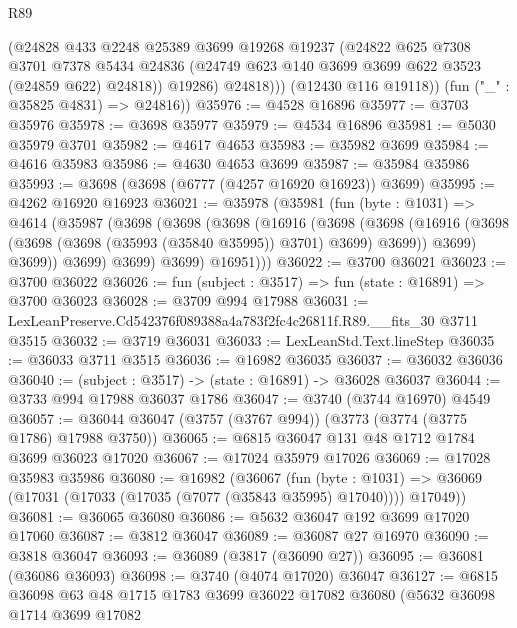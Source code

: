 \begin{lexlean}{R89}
\begin{coremodule}
              (@24828
                @433
                @2248
                @25389
                @3699
                @19268
                @19237
                (@24822
                  @625
                  @7308
                  @3701
                  @7378
                  @5434
                  @24836
                  (@24749 @623 @140 @3699 @3699 @622 @3523 (@24859 @622) @24818))
                @19286)
              @24818)))
        (@12430 @116 @19118))
      (fun ("_" : @35825 @4831) => @24816))
@35976 := @4528 @16896
@35977 := @3703 @35976
@35978 := @3698 @35977
@35979 := @4534 @16896
@35981 := @5030 @35979 @3701
@35982 := @4617 @4653
@35983 := @35982 @3699
@35984 := @4616 @35983
@35986 := @4630 @4653 @3699
@35987 := @35984 @35986
@35993 := @3698 (@3698 (@6777 (@4257 @16920 @16923)) @3699)
@35995 := @4262 @16920 @16923
@36021 := @35978
    (@35981
      (fun (byte : @1031) =>
      @4614
        (@35987
          (@3698
            (@3698
              (@3698
                (@16916
                  (@3698
                    (@3698
                      (@16916 (@3698 (@3698 (@3698 (@35993 (@35840 @35995)) @3701) @3699) @3699))
                      @3699)
                    @3699))
                @3699)
              @3699)
            @3699)
          @16951)))
@36022 := @3700 @36021
@36023 := @3700 @36022
@36026 := fun (subject : @3517) => fun (state : @16891) => @3700 @36023
@36028 := @3709 @994 @17988
@36031 := LexLeanPreserve.Cd542376f089388a4a783f2fc4c26811f.R89.__fits_30 @3711 @3515
@36032 := @3719 @36031
@36033 := LexLeanStd.Text.lineStep
@36035 := @36033 @3711 @3515
@36036 := @16982 @36035
@36037 := @36032 @36036
@36040 := (subject : @3517) -> (state : @16891) -> @36028 @36037
@36044 := @3733 @994 @17988 @36037 @1786
@36047 := @3740 (@3744 @16970) @4549
@36057 := @36044 @36047 (@3757 (@3767 @994)) (@3773 (@3774 (@3775 @1786) @17988 @3750))
@36065 := @6815 @36047 @131 @48 @1712 @1784 @3699 @36023 @17020
@36067 := @17024 @35979 @17026
@36069 := @17028 @35983 @35986
@36080 := @16982
    (@36067
      (fun (byte : @1031) =>
      @36069 (@17031 (@17033 (@17035 (@7077 (@35843 @35995) @17040)))) @17049))
@36081 := @36065 @36080
@36086 := @5632 @36047 @192 @3699 @17020 @17060
@36087 := @3812 @36047
@36089 := @36087 @27 @16970
@36090 := @3818 @36047
@36093 := @36089 (@3817 (@36090 @27))
@36095 := @36081 (@36086 @36093)
@36098 := @3740 (@4074 @17020) @36047
@36127 := @6815
    @36098
    @63
    @48
    @1715
    @1783
    @3699
    @36022
    @17082
    @36080
    (@5632
      @36098
      @1714
      @3699
      @17082

\end{coremodule}
\end{lexlean}
